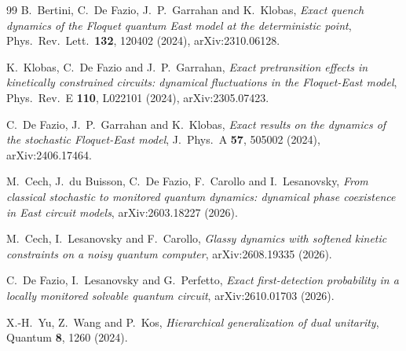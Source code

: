 \begin{thebibliography}{99}
 B.~Bertini, C.~De Fazio, J.~P.~Garrahan and K.~Klobas, \emph{Exact quench dynamics of the
  Floquet quantum East model at the deterministic point}, Phys.\ Rev.\ Lett.\ \textbf{132}, 120402 (2024),
  arXiv:2310.06128.

 K.~Klobas, C.~De Fazio and J.~P.~Garrahan, \emph{Exact pretransition effects in kinetically
  constrained circuits: dynamical fluctuations in the Floquet-East model}, Phys.\ Rev.\ E \textbf{110}, L022101 (2024),
  arXiv:2305.07423.

 C.~De Fazio, J.~P.~Garrahan and K.~Klobas, \emph{Exact results on the dynamics of the stochastic
  Floquet-East model}, J.\ Phys.\ A \textbf{57}, 505002 (2024), arXiv:2406.17464.

 M.~Cech, J.~du Buisson, C.~De Fazio, F.~Carollo and I.~Lesanovsky, \emph{From classical stochastic
  to monitored quantum dynamics: dynamical phase coexistence in East circuit models}, arXiv:2603.18227 (2026).

 M.~Cech, I.~Lesanovsky and F.~Carollo, \emph{Glassy dynamics with softened kinetic constraints on a
  noisy quantum computer}, arXiv:2608.19335 (2026).


 C.~De Fazio, I.~Lesanovsky and G.~Perfetto, \emph{Exact first-detection probability in a locally
  monitored solvable quantum circuit}, arXiv:2610.01703 (2026).

 X.-H.~Yu, Z.~Wang and P.~Kos, \emph{Hierarchical generalization of dual unitarity}, Quantum
  \textbf{8}, 1260 (2024).

\end{thebibliography}
